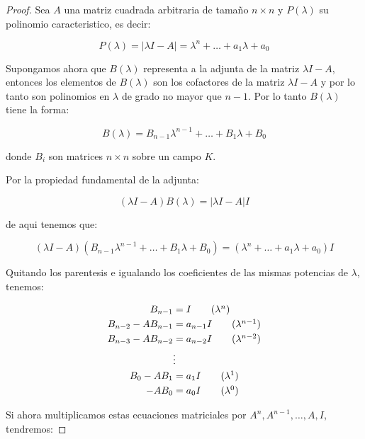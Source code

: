 	\begin{proof}
		Sea $A$ una matriz cuadrada arbitraria de tamaño $n \times n$ y $P(\lambda)$ su polinomio caracteristico, es decir:

		\begin{equation*}
			P(\lambda) = |\lambda I - A| = \lambda^n + \dots + a_1 \lambda + a_0
		\end{equation*}

		Supongamos ahora que $B(\lambda)$ representa a la adjunta de la matriz $\lambda I - A$, entonces los elementos de $B(\lambda)$ son los cofactores de la matriz $\lambda I - A$ y por lo tanto son polinomios en $\lambda$ de grado no mayor que $n-1$.
		Por lo tanto $B(\lambda)$ tiene la forma:

		\begin{equation*}
			B(\lambda) = B_{n-1} \lambda^{n-1} + \dots + B_1 \lambda + B_0
		\end{equation*}

		donde $B_i$ son matrices $n \times n$ sobre un campo $K$.

		Por la propiedad fundamental de la adjunta:

		\begin{equation*}
			(\lambda I - A) B(\lambda) = |\lambda I - A| I
		\end{equation*}

		de aqui tenemos que:

		\begin{equation*}
			(\lambda I - A) (B_{n-1} \lambda^{n-1} + \dots + B_1 \lambda + B_0) = (\lambda^n + \dots + a_1 \lambda + a_0) I
		\end{equation*}

		Quitando los parentesis e igualando los coeficientes de las mismas potencias de $\lambda$, tenemos:

		\begin{align*}
			B_{n-1} & = I \tag{$\lambda^n$} \\
			B_{n-2} - A B_{n-1} & = a_{n-1} I \tag{$\lambda^{n-1}$} \\
			B_{n-3} - A B_{n-2} & = a_{n-2} I \tag{$\lambda^{n-2}$} \\
			& \vdots \\
			B_0 - A B_1 & = a_1 I \tag{$\lambda^1$} \\
			- A B_0 & = a_0 I \tag{$\lambda^0$}
		\end{align*}

		Si ahora multiplicamos estas ecuaciones matriciales por $A^n, A^{n-1}, \dots, A, I$, tendremos:


\end{proof}
